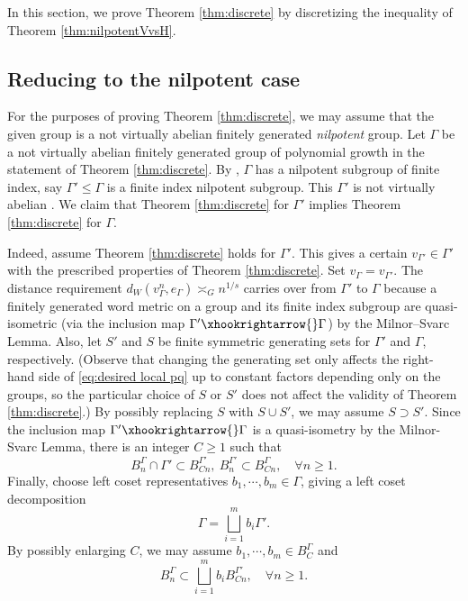 \documentclass[11pt,reqno]{amsart}
\newcommand{\1}{\mathbf 1}
\begin{document}
In this section, we prove Theorem \ref{thm:discrete} by discretizing the inequality of Theorem \ref{thm:nilpotentVvsH}.

\subsection{Reducing to the nilpotent case}
For the purposes of proving Theorem \ref{thm:discrete}, we may assume that the given group is a not virtually abelian finitely generated \emph{nilpotent} group. Let $\Gamma$ be a not virtually abelian finitely generated group of polynomial growth in the statement of Theorem \ref{thm:discrete}. By \cite{gromov1981groups}, $\Gamma$ has a nilpotent subgroup of finite index, say $\Gamma'\le \Gamma$ is a finite index nilpotent subgroup. This $\Gamma'$ is not virtually abelian \cite[Corollary 1.5]{de2007isometric}. We claim that Theorem \ref{thm:discrete} for $\Gamma'$ implies Theorem \ref{thm:discrete} for $\Gamma$.

Indeed, assume Theorem \ref{thm:discrete} holds for $\Gamma'$. This gives a certain $v_{\Gamma'}\in \Gamma'$ with the prescribed properties of Theorem \ref{thm:discrete}. Set $v_\Gamma=v_{\Gamma'}$. The distance requirement $d_W\left(v^n_\Gamma,e_\Gamma\right)\asymp_G n^{1/s}$ carries over from $\Gamma'$ to $\Gamma$ because a finitely generated word metric on a group and its finite index subgroup are quasi-isometric (via the inclusion map $\Gamma'\xhookrightarrow{} \Gamma$) by the Milnor--Svarc Lemma. Also, let $S'$ and $S$ be finite symmetric generating sets for $\Gamma'$ and $\Gamma$, respectively. (Observe that changing the generating set only affects the right-hand side of \eqref{eq:desired local pq} up to constant factors depending only on the groups, so the particular choice of $S$ or $S'$ does not affect the validity of Theorem \ref{thm:discrete}.) By possibly replacing $S$ with $S\cup S'$, we may assume $S\supset S'$. Since the inclusion map $\Gamma'\xhookrightarrow{}\Gamma$ is a quasi-isometry by the Milnor-Svarc Lemma, there is an integer $C\ge 1$ such that
\[
B_n^\Gamma \cap \Gamma'\subset B^{\Gamma'}_{Cn},~ B_n^{\Gamma'}\subset B^\Gamma_{Cn},\quad \forall n\ge 1.
\]
Finally, choose left coset representatives $b_1,\cdots,b_m\in \Gamma$, giving a left coset decomposition
\[
\Gamma=\bigsqcup_{i=1}^m b_i\Gamma'.
\]
By possibly enlarging $C$, we may assume $b_1,\cdots,b_m\in B_C^\Gamma$ and
\begin{equation}\label{eq:generator-qi}
B^\Gamma_n\subset \bigsqcup_{i=1}^m b_iB^{\Gamma'}_{Cn},\quad \forall n\ge 1.
\end{equation}
\end{document}
